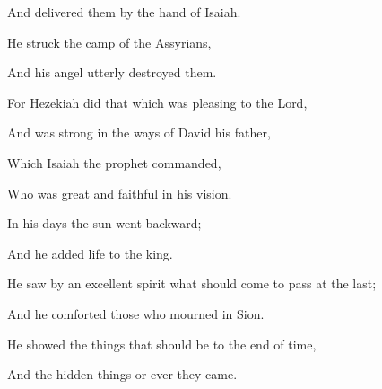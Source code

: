 {\par }{\Q And delivered them by the hand of Isaiah.
\par }{\Q {}He struck the camp of the Assyrians,
\par }{\Q And his angel utterly destroyed them.
\par }{\Q {}For Hezekiah did that which was pleasing to the Lord,
\par }{\Q And was strong in the ways of David his father,
\par }{\Q Which Isaiah the prophet commanded,
\par }{\Q Who was great and faithful in his vision.
\par }{\Q {}In his days the sun went backward;
\par }{\Q And he added life to the king.
\par }{\Q {}He saw by an excellent spirit what should come to pass at the last;
\par }{\Q And he comforted those who mourned in Sion.
\par }{\Q {}He showed the things that should be to the end of time,
\par }{\Q And the hidden things or ever they came.
\par }{\BB \par }
